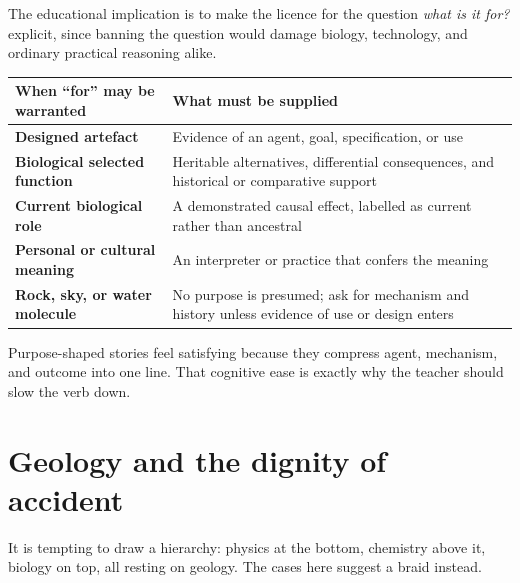 The educational implication is to make the licence for the question \emph{what is it for?} explicit, since banning the question would damage biology, technology, and ordinary practical reasoning alike.

\begin{center}
\small
\renewcommand{\arraystretch}{1.22}
\begin{tabularx}{.95\linewidth}{>{\bfseries\color{autumn}}p{.30\linewidth}X}
\toprule
\textbf{When ``for'' may be warranted} & \textbf{What must be supplied} \\
\midrule
Designed artefact & Evidence of an agent, goal, specification, or use \\
Biological selected function & Heritable alternatives, differential consequences, and historical or comparative support \\
Current biological role & A demonstrated causal effect, labelled as current rather than ancestral \\
Personal or cultural meaning & An interpreter or practice that confers the meaning \\
Rock, sky, or water molecule & No purpose is presumed; ask for mechanism and history unless evidence of use or design enters \\
\bottomrule
\end{tabularx}
\end{center}

Purpose-shaped stories feel satisfying because they compress agent, mechanism, and outcome into one line. That cognitive ease is exactly why the teacher should slow the verb down.

\section{Geology and the dignity of accident}

It is tempting to draw a hierarchy: physics at the bottom, chemistry above it, biology on top, all resting on geology. The cases here suggest a braid instead.

\begin{center}
\end{center}

